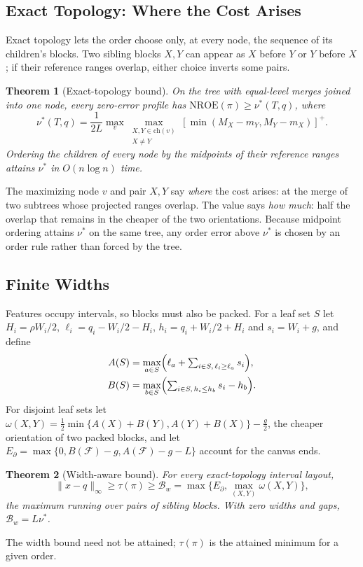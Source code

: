 \documentclass[review]{vgtc}
\newtheorem{theorem}{Theorem}
\newcommand{\nroe}{\mathrm{NROE}}
\begin{document}
\subsection{Exact Topology: Where the Cost Arises}
Exact topology lets the order choose only, at every node, the sequence of its children's blocks. Two sibling blocks $X,Y$ can appear as $X$ before $Y$ or $Y$ before $X$; if their reference ranges overlap, either choice inverts some pairs.
\begin{theorem}[Exact-topology bound]\label{thm:order}
On the tree with equal-level merges joined into one node, every zero-error profile has $\nroe(\pi)\ge\nu^*(T,q)$, where
\begin{equation}\label{eq:nu}
 \nu^*(T,q)=\frac{1}{2L}\max_v\max_{\substack{X,Y\in\mathrm{ch}(v)\\X\ne Y}}
 [\min(M_X-m_Y,M_Y-m_X)]^+.
\end{equation}
Ordering the children of every node by the midpoints of their reference ranges attains $\nu^*$ in $O(n\log n)$ time.
\end{theorem}
The maximizing node $v$ and pair $X,Y$ say \emph{where} the cost arises: at the merge of two subtrees whose projected ranges overlap. The value says \emph{how much}: half the overlap that remains in the cheaper of the two orientations. Because midpoint ordering attains $\nu^*$ on the same tree, any order error above $\nu^*$ is chosen by an order rule rather than forced by the tree.

\subsection{Finite Widths}
Features occupy intervals, so blocks must also be packed. For a leaf set $S$ let $H_i=\rho W_i/2$, $\ell_i=q_i-W_i/2-H_i$, $h_i=q_i+W_i/2+H_i$ and $s_i=W_i+g$, and define
\begin{equation}\label{eq:packing}
\begin{aligned}
 A(S)&=\max_{a\in S}\Bigl(\ell_a+\textstyle\sum_{i\in S,\,\ell_i\ge\ell_a}s_i\Bigr),\\
 B(S)&=\max_{b\in S}\Bigl(\textstyle\sum_{i\in S,\,h_i\le h_b}s_i-h_b\Bigr).
\end{aligned}
\end{equation}
For disjoint leaf sets let $\omega(X,Y)=\tfrac12\min\{A(X)+B(Y),A(Y)+B(X)\}-\tfrac g2$, the cheaper orientation of two packed blocks, and let $E_\partial=\max\{0,B(\mathcal{F})-g,A(\mathcal{F})-g-L\}$ account for the canvas ends.
\begin{theorem}[Width-aware bound]\label{thm:width}
For every exact-topology interval layout,
\begin{equation}\label{eq:widthbound}
 \|x-q\|_\infty\ge\tau(\pi)\ge\mathcal{B}_w=\max\{E_\partial,\max_{(X,Y)}\omega(X,Y)\},
\end{equation}
the maximum running over pairs of sibling blocks. With zero widths and gaps, $\mathcal{B}_w=L\nu^*$.
\end{theorem}
The width bound need not be attained; $\tau(\pi)$ is the attained minimum for a given order.
\end{document}
